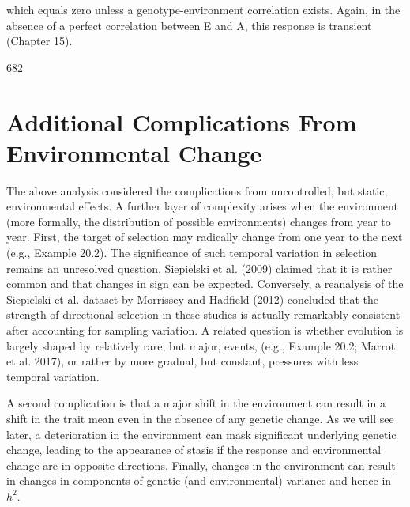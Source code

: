 \documentclass{article}
\begin{document}
which equals zero unless a genotype-environment correlation exists. Again, in the absence of a perfect correlation between E and A, this response is transient (Chapter 15).

682

\section{Additional Complications From Environmental Change}
The above analysis considered the complications from uncontrolled, but static, environmental effects. A further layer of complexity arises when the environment (more formally, the distribution of possible environments) changes from year to year. First, the target of selection may radically change from one year to the next (e.g., Example 20.2). The significance of such temporal variation in selection remains an unresolved question. Siepielski et al. (2009) claimed that it is rather common and that changes in sign can be expected. Conversely, a reanalysis of the Siepielski et al. dataset by Morrissey and Hadfield (2012) concluded that the strength of directional selection in these studies is actually remarkably consistent after accounting for sampling variation. A related question is whether evolution is largely shaped by relatively rare, but major, events, (e.g., Example 20.2; Marrot et al. 2017), or rather by more gradual, but constant, pressures with less temporal variation.

A second complication is that a major shift in the environment can result in a shift in the trait mean even in the absence of any genetic change. As we will see later, a deterioration in the environment can mask significant underlying genetic change, leading to the appearance of stasis if the response and environmental change are in opposite directions. Finally, changes in the environment can result in changes in components of genetic (and environmental) variance and hence in  $ h^{2} $.
\end{document}
